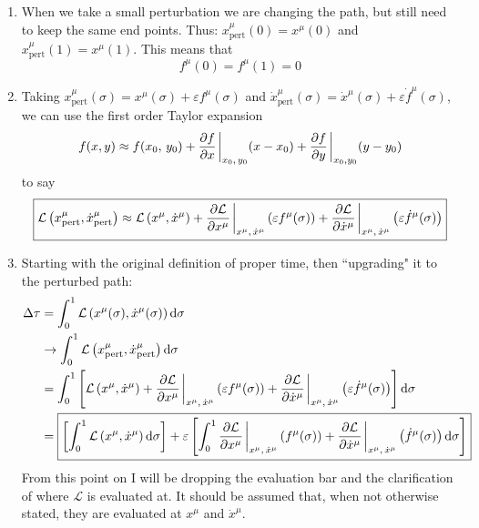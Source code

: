 \documentclass[11pt]{article}
\begin{document}
\begin{enumerate}[label=\alph*)]
\item When we take a small perturbation we are changing the path, but still need to keep the same end points. Thus: $x^\mu_{\text{pert}}(0) = x^\mu(0)$ and $x^\mu_{\text{pert}}(1) = x^\mu(1)$. This means that
\[\boxed{f^\mu(0) = f^\mu(1) = 0}\]


\item Taking $\displaystyle{x^\mu_{\text{pert}}(\sigma) = x^\mu(\sigma)+\varepsilon f^\mu(\sigma)}$ and $\displaystyle{\dot{x}^\mu_{\text{pert}}(\sigma) = \dot{x}^\mu(\sigma)+\varepsilon \dot{f}^\mu(\sigma)}$, we can use the first order Taylor expansion
\[f(x,y) \approx f(x_0,\, y_0) + \pdv{f}{x}\eval_{x_0,\, y_0}(x-x_0)+ \pdv{f}{y}\eval_{x_0, y_0}(y-y_0)\]
to say
\[\boxed{\mathcal{L}\left(x^\mu_{\text{pert}}, \dot{x}^\mu_{\text{pert}}\right) \approx \mathcal{L}\left(x^\mu, \dot{x}^\mu\right)+ \pdv{\mathcal{L}}{x^\mu}\eval_{x^\mu,\, \dot{x}^\mu}\left(\varepsilon f^\mu(\sigma)\right) + \pdv{\mathcal{L}}{\dot{x}^\mu}\eval_{x^\mu,\, \dot{x}^\mu}\left(\varepsilon \dot{f}^\mu(\sigma)\right)}\]


\item Starting with the original definition of proper time, then ``upgrading" it to the perturbed path:
\begin{align*}
\Delta \tau & = \int_0^1 \mathcal{L}\left(x^\mu(\sigma), \dot{x}^\mu(\sigma)\right)\dd{\sigma}\\
& \rightarrow \int_0^1 \mathcal{L}\left(x^\mu_{\text{pert}}, \dot{x}^\mu_{\text{pert}}\right)\dd{\sigma}\\
& = \int_0^1 \left[\mathcal{L}\left(x^\mu, \dot{x}^\mu\right)+ \pdv{\mathcal{L}}{x^\mu}\eval_{x^\mu,\, \dot{x}^\mu}\left(\varepsilon f^\mu(\sigma)\right) + \pdv{\mathcal{L}}{\dot{x}^\mu}\eval_{x^\mu,\, \dot{x}^\mu}\left(\varepsilon \dot{f}^\mu(\sigma)\right)\right] \dd{\sigma}\\
& = \boxed{\left[\int_0^1 \mathcal{L}\left(x^\mu, \dot{x}^\mu\right)\dd{\sigma}\right] + \varepsilon \left[\int_0^1 \pdv{\mathcal{L}}{x^\mu}\eval_{x^\mu,\, \dot{x}^\mu}\left(f^\mu(\sigma)\right) + \pdv{\mathcal{L}}{\dot{x}^\mu}\eval_{x^\mu,\, \dot{x}^\mu}\left(\dot{f}^\mu(\sigma)\right)\dd{\sigma}\right]}
\end{align*}
From this point on I will be dropping the evaluation bar and the clarification of where $\mathcal{L}$ is evaluated at. It should be assumed that, when not otherwise stated, they are evaluated at $x^\mu$ and $\dot{x}^\mu$.


\end{enumerate}
\end{document}
